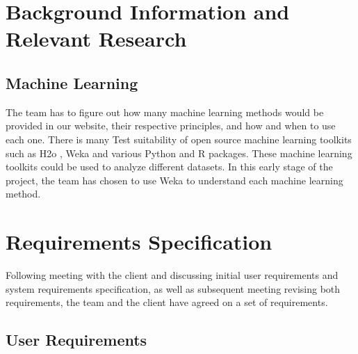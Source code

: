 \documentclass[titlepage]{article}
\begin{document}
\section{Background Information and \\Relevant Research}
\subsection{Machine Learning}
The team has to figure out how many machine learning methods would be provided in our website, their respective principles, and how and when to use each one.
There is many Test suitability of open source machine learning toolkits such as H2o \cite{h2o.ai}, Weka \cite{weka} and various Python and R packages. These machine learning toolkits could be used to analyze different datasets. In this early stage of the project, the team has chosen to use Weka to understand each machine learning method.

\section{Requirements Specification}
Following meeting with the client and discussing initial user requirements and system requirements specification, as well as subsequent meeting revising both requirements, the team and the client have agreed on a set of requirements.

\subsection{User Requirements}
\end{document}
